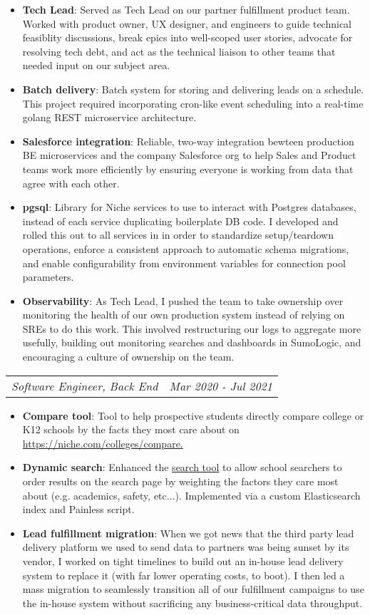 \documentclass[letterpaper,11pt]{article}
\makeatletter
\newenvironment{resumeHeadingList}{\begin{itemize}[leftmargin=*]}{\end{itemize}}
\newenvironment{resumeItemList}{\begin{itemize}}{\end{itemize}\vspace{-5pt}}
\newcommand{\resumeItem}[2]{
  \item\small{
    \textbf{#1}{: #2 \vspace{-2pt}}
  }
}
\newcommand{\resumeSubheading}[2]{
    \begin{tabular*}{0.97\textwidth}{l@{\extracolsep{\fill}}r}
      \textit{\small#1} & \textit{\small #2} \\
    \end{tabular*}\vspace{-5pt}
}
\makeatother
\begin{document}
\begin{resumeHeadingList}
\begin{resumeItemList}
          \resumeItem{Tech Lead}{Served as Tech Lead on our partner fulfillment product team. Worked with product owner, UX designer, and engineers to guide technical feasiblity discussions, break epics into well-scoped user stories, advocate for resolving tech debt, and act as the technical liaison to other teams that needed input on our subject area.}
          \resumeItem{Batch delivery}{Batch system for storing and delivering leads on a schedule. This project required incorporating cron-like event scheduling into a real-time golang REST microservice architecture.}
          \resumeItem{Salesforce integration}{Reliable, two-way integration bewteen production BE microservices and the company Salesforce org to help Sales and Product teams work more efficiently by ensuring everyone is working from data that agree with each other.}
          \resumeItem{pgsql}{Library for Niche services to use to interact with Postgres databases, instead of each service duplicating boilerplate DB code. I developed and rolled this out to all services in in order to standardize setup/teardown operations, enforce a consistent approach to automatic schema migrations, and enable configurability from environment variables for connection pool parameters.}
          \resumeItem{Observability}{As Tech Lead, I pushed the team to take ownership over monitoring the health of our own production system instead of relying on SREs to do this work. This involved restructuring our logs to aggregate more usefully, building out monitoring searches and dashboards in SumoLogic, and encouraging a culture of ownership on the team.}
        \end{resumeItemList}
      \resumeSubheading
        {Software Engineer, Back End}{Mar 2020 - Jul 2021}
        \begin{resumeItemList}
          \resumeItem{Compare tool}{Tool to help prospective students directly compare college or K12 schools by the facts they most care about on \href{https://niche.com/colleges/compare}{https://niche.com/colleges/compare.}}
          \resumeItem{Dynamic search}{Enhanced the \href{https://www.niche.com/colleges/search/college-quiz/}{search tool} to allow school searchers to order results on the search page by weighting the factors they care most about (e.g. academics, safety, etc...). Implemented via a custom Elasticsearch index and Painless script.}
          \resumeItem{Lead fulfillment migration}{When we got news that the third party lead delivery platform we used to send data to partners was being sunset by its vendor, I worked on tight timelines to build out an in-house lead delivery system to replace it (with far lower operating costs, to boot). I then led a mass migration to seamlessly transition all of our fulfillment campaigns to use the in-house system without sacrificing any business-critical data throughput.}
        \end{resumeItemList}
        

\end{resumeHeadingList}
\end{document}
